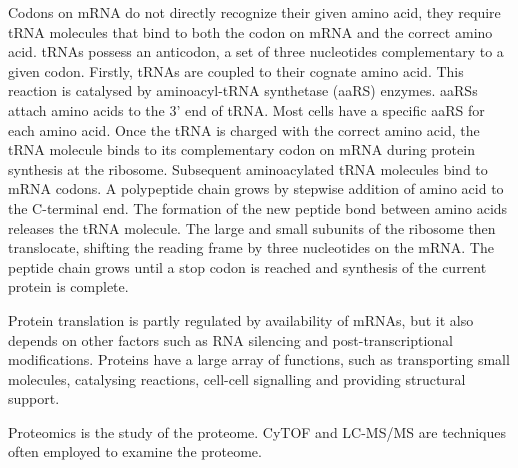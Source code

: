 Codons on mRNA do not directly recognize their given amino acid, they require tRNA molecules that bind to both the codon on mRNA and the correct amino acid.
tRNAs possess an anticodon, a set of three nucleotides complementary to a given codon.
Firstly, tRNAs are coupled to their cognate amino acid.
This reaction is catalysed by aminoacyl-tRNA synthetase (aaRS) enzymes.
aaRSs attach amino acids to the 3' end of tRNA\@.
Most cells have a specific aaRS for each amino acid.
Once the tRNA is charged with the correct amino acid, the tRNA molecule binds to its complementary codon on mRNA during protein synthesis at the ribosome.
Subsequent aminoacylated tRNA molecules bind to mRNA codons.
A polypeptide chain grows by stepwise addition of amino acid to the C-terminal end.
The formation of the new peptide bond between amino acids releases the tRNA molecule.
The large and small subunits of the ribosome then translocate, shifting the reading frame by three nucleotides on the mRNA\@.
The peptide chain grows until a stop codon is reached and synthesis of the current protein is complete\cite{alberts2007molecular}.

Protein translation is partly regulated by availability of mRNAs, but it also depends on other factors such as RNA silencing and post-transcriptional modifications.
Proteins have a large array of functions, such as transporting small molecules, catalysing reactions, cell-cell signalling and providing structural support.

Proteomics is the study of the proteome.
CyTOF and LC-MS/MS are techniques often employed to examine the proteome. %

